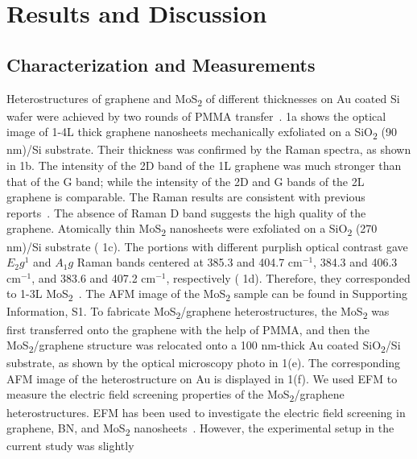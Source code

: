 \section{Results and Discussion}
\label{sec:asym-results}
\subsection{Characterization and Measurements}
\label{sec:asym-exp}
Heterostructures of graphene and MoS\textsubscript{2} of different thicknesses on Au
coated Si wafer were achieved by two rounds of PMMA
transfer~\cite{Minemawari_2011_inkjet_PMMA}.  1a shows the
optical image of 1-4L thick graphene nanosheets mechanically
exfoliated on a SiO\textsubscript{2} (90 nm)/Si substrate. Their thickness was
confirmed by the Raman spectra, as shown in  1b. The intensity
of the 2D band of the 1L graphene was much stronger than that of the G
band; while the intensity of the 2D and G bands of the 2L graphene is
comparable. The Raman results are consistent with previous
reports~\cite{Ferrari_2006_raman}.  The absence of Raman D band
suggests the high quality of the graphene. Atomically thin MoS\textsubscript{2}
nanosheets were exfoliated on a SiO\textsubscript{2} (270 nm)/Si substrate (
1c). The portions with different purplish optical contrast gave
$E_2g^1$ and $A_1g$ Raman bands centered at 385.3 and 404.7 cm$^{-1}$,
384.3 and 406.3 cm$^{-1}$, and 383.6 and 407.2 cm$^{-1}$, respectively (
1d). Therefore, they corresponded to 1-3L
MoS\textsubscript{2}~\cite{Lee_2010_anomal_raman_mos2,Chakraborty_2012_mos2_layer_raman}. The
AFM image of the MoS\textsubscript{2} sample can be found in Supporting Information,
 S1. To fabricate MoS\textsubscript{2}/graphene heterostructures, the MoS\textsubscript{2} was
first transferred onto the graphene with the help of PMMA, and then
the MoS\textsubscript{2}/graphene structure was relocated onto a 100 nm-thick Au
coated SiO\textsubscript{2}/Si substrate, as shown by the optical microscopy photo in
 1(e). The corresponding AFM image of the heterostructure on Au
is displayed in  1(f).  We used EFM to measure the electric
field screening properties of the MoS\textsubscript{2}/graphene heterostructures. EFM
has been used to investigate the electric field screening in graphene,
BN, and MoS\textsubscript{2}
nanosheets~\cite{Datta_2009_ML_Screening,Castellanos_Gomez_2012_interlayer,Li_2014_screen}.
%
However, the experimental setup in the current study was slightly

